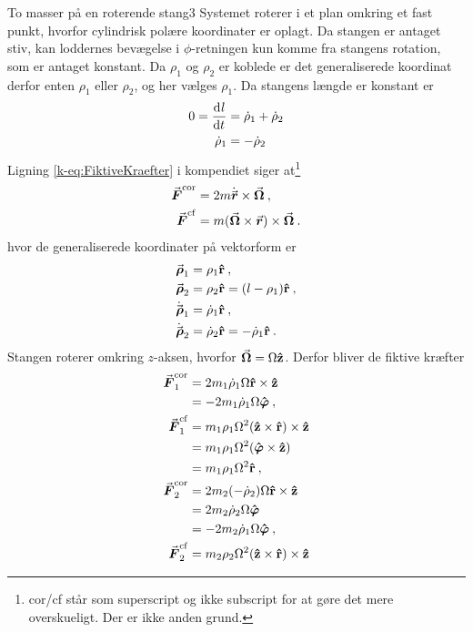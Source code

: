 \begin{opgave}{To masser på en roterende stang}{3}
\opg Systemet roterer i et plan omkring et fast punkt, hvorfor cylindrisk polære koordinater er oplagt.
\opg Da stangen er antaget stiv, kan loddernes bevægelse i $\phi$-retningen kun komme fra stangens rotation, som er antaget konstant. Da $\rho_1$ og $\rho_2$ er koblede er det generaliserede koordinat derfor enten $\rho_1$ eller $\rho_2$, og her vælges $\rho_1$.
\opg Da stangens længde er konstant er
\begin{align*}
	0 = \dif{t}{l}& = \dt{\rho}_1 + \dt{\rho}_2 \\
	\dt{\rho}_1 &= -\dt{\rho}_2
\end{align*}
\opg Ligning \eqref{k-eq:FiktiveKraefter} i kompendiet siger at\footnote{cor/cf står som superscript og ikke subscript for at gøre det mere overskueligt. Der er ikke anden grund.}
\begin{align*}
	\v{F}^\mathrm{cor} &= 2m\dt{\v{r}}\times\v{\Omega} \: , \\
	\v{F}^\mathrm{cf} &= m(\v{\Omega} \times \v{r}) \times \v{\Omega} \: .
\end{align*}
hvor de generaliserede koordinater på vektorform er
\begin{align*}
	\v{\rho}_1 &= \rho_1\rhat \: , \\
	\v{\rho}_2 &= \rho_2\rhat = (l-\rho_1)\rhat \: ,\\
	\dt{\v{\rho}}_1 &= \dt{\rho}_1\rhat \: , \\
	\dt{\v{\rho}}_2 &= \dt{\rho}_2\rhat = -\dt{\rho}_1\rhat \: .
\end{align*}
Stangen roterer omkring $z$-aksen, hvorfor $\v{\Omega} = \Omega\zhat$. Derfor bliver de fiktive kræfter
\begin{align*}
	\v{F}_1^\mathrm{cor} &= 2m_1\dt{\rho}_1\Omega\rhat\times \zhat \\
	&= -2m_1\dt{\rho}_1\Omega\phhat \: , \\
	\v{F}_1^\mathrm{cf}	&= m_1\rho_1\Omega^2(\zhat \times \rhat) \times \zhat \\
	&= m_1\rho_1\Omega^2(\phhat \times \zhat) \\
	&= m_1\rho_1\Omega^2\rhat \: , \\
	\v{F}_2^\mathrm{cor} &= 2m_2(-\dt{\rho}_2)\Omega\rhat\times \zhat \\
	&= 2m_2\dt{\rho}_2\Omega\phhat \\
	&= -2m_2\dt{\rho}_1\Omega\phhat \: , \\
	\v{F}_2^\mathrm{cf} &= m_2\rho_2\Omega^2(\zhat \times \rhat) \times \zhat \\

\end{align*}
\end{opgave}
